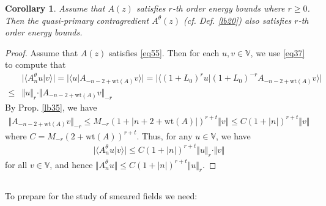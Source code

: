 \documentclass[12pt,b5paper,notitlepage]{article}
\theoremstyle{definition}
\theoremstyle{plain}
\newtheorem{co}[df]{Corollary}
\newcommand{\bk}[1]{\langle {#1}\rangle}
\newcommand{\Vbb}{\mathbb V}
\newcommand{\wt}{\mathrm{wt}}
\numberwithin{equation}{section}
\begin{document}
\begin{co}
Assume that $A(z)$ satisfies $r$-th order energy bounds where $r\geq0$. Then the quasi-primary contragredient $A^\theta(z)$ (cf. Def. \ref{lb20}) also satisfies $r$-th order energy bounds.
\end{co}


\begin{proof}
Assume that $A(z)$ satisfies \eqref{eq55}. Then for each $u,v\in\Vbb$, we use \eqref{eq37} to compute that
\begin{align*}
&\big|\bk{A^\theta_nu|v}\big|=\big|\bk{u|A_{-n-2+\wt(A)}v}\big|=\big|\bk{(1+L_0)^ru|(1+L_0)^{-r}A_{-n-2+\wt(A)}v}   \big|\\
\leq& \Vert u\Vert_r\cdot \Vert A_{-n-2+\wt(A)}v\Vert_{-r}
\end{align*}
By Prop. \ref{lb35}, we have
\begin{align*}
\Vert A_{-n-2+\wt(A)}v\Vert_{-r}\leq M_{-r}(1+|n+2+\wt(A)|)^{r+t}\Vert v\Vert\leq C (1+|n|)^{r+t}\Vert v\Vert
\end{align*}
where $C=M_{-r}(2+\wt(A))^{r+t}$. Thus, for any $u\in\Vbb$, we have
\begin{align*}
\big|\bk{A^\theta_nu|v}\big|\leq C(1+|n|)^{r+t} \Vert u\Vert_r\cdot \Vert v\Vert
\end{align*}
for all $v\in\Vbb$, and hence $\Vert A^\theta_n u\Vert\leq C(1+|n|)^{r+t}\Vert u\Vert_r$.
\end{proof}







\subsection{}\label{lb44}

To prepare for the study of smeared fields we need:
\end{document}
